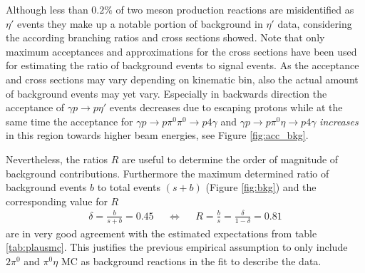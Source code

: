 Although less than $0.2\%$ of two meson production reactions are misidentified as $\eta'$ events they make up a notable portion of background in $\eta'$ data, considering the according branching ratios and cross sections showed. Note that only maximum acceptances and approximations for the cross sections have been used for estimating the  ratio of background events to signal events. As the acceptance and cross sections may vary depending on kinematic bin, also the actual amount of background events may yet vary. Especially in backwards direction the acceptance of $\gamma p \to p\eta'$ events decreases due to escaping protons while at the same time the acceptance for $\gamma p \to p\pi^0\pi^0\to p4\gamma$ and $\gamma p \to p \pi^0\eta\to p 4\gamma$ \emph{increases} in this region towards higher beam energies, see Figure \ref{fig:acc_bkg}. 

Nevertheless, the ratios $R$ are useful to determine the order of magnitude of background contributions. Furthermore the maximum determined ratio of  background events $b$ to total events $\left(s+b\right)$ (Figure \ref{fig:bkg}) and the corresponding value for $R$
\begin{align}
\delta=\frac{b}{s+b}=0.45&&\Leftrightarrow&&R=\frac{b}{s}=\frac{\delta}{1-\delta}=0.81
\end{align} are in very good agreement with the estimated expectations from table \ref{tab:plausmc}. This justifies the previous empirical assumption to only include $2\pi^0$ and $\pi^0\eta$ MC as background reactions in the fit to describe the data.
   
